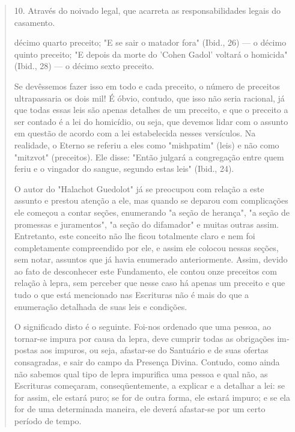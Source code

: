 \begin{quote}
10. Através do noivado legal, que acarreta as responsabilidades legais
do casamento.

décimo quarto preceito; "E se sair o matador fora" (Ibid., 26) --- o
décimo quinto preceito; "E depois da morte do 'Cohen Gadol' voltará o
homicida" (Ibid., 28) --- o décimo sexto preceito.

Se devêssemos fazer isso em todo e cada preceito, o número de pre­ceitos
ultrapassaria os dois mil! É óbvio, contudo, que isso não seria
racional, já que todas essas leis são apenas detalhes de um preceito, e
que o preceito a ser contado é a lei do homicídio, ou seja, que devemos
lidar com o assunto em questão de acordo com a lei estabelecida nesses
versículos. Na realidade, o Eterno se referiu a eles como "mishpatim"
(leis) e não como "mitzvot" (pre­ceitos). Ele disse: "Então julgará a
congregação entre quem feriu e o vingador do sangue, segundo estas leis"
(Ibid., 24).

O autor do "Halachot Guedolot" já se preocupou com relação a es­te
assunto e prestou atenção a ele, mas quando se deparou com complicações
ele começou a contar seções, enumerando "a seção de herança", "a seção
de promessas e juramentos", "a seção do difamador" e muitas outras
assim. En­tretanto, este conceito não lhe ficou totalmente claro e nem
foi completamen­te compreendido por ele, e assim ele colocou nessas
seções, sem notar, assun­tos que já havia enumerado anteriormente.
Assim, devido ao fato de desconhe­cer este Fundamento, ele contou onze
preceitos com relação à lepra, sem per­ceber que nesse caso há apenas um
preceito e que tudo o que está mencionado nas Escrituras não é mais do
que a enumeração detalhada de suas leis e condições.

O significado disto é o seguinte. Foi-nos ordenado que uma pessoa, ao
tornar-se impura por causa da lepra, deve cumprir todas as obrigações
im­postas aos impuros, ou seja, afastar-se do Santuário e de suas
ofertas consagra­das, e sair do campo da Presença Divina. Contudo, como
ainda não sabemos qual tipo de lepra impurifica uma pessoa e qual não,
as Escrituras começaram, conseqüentemente, a explicar e a detalhar a
lei: se for assim, ele estará puro; se for de outra forma, ele estará
impuro; e se ela for de uma determinada ma­neira, ele deverá afastar-se
por um certo período de tempo.


\end{quote}
